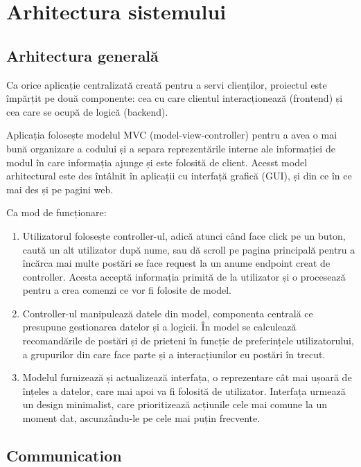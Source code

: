 
\chapter{Arhitectura sistemului}
\label{Arhitectura sistemului}
    \section{Arhitectura generală}
    \label{Arhitectura generală}
    Ca orice aplicație centralizată creată pentru a servi clienților, proiectul este împărțit pe două componente: cea cu care clientul interacționează (frontend) și cea care se ocupă de logică (backend).

    Aplicația folosește modelul MVC (model-view-controller) pentru a avea o mai bună organizare a codului și a separa reprezentările interne ale informației de modul în care informația ajunge și este folosită de client. Acesst model arhitectural este des întâlnit în aplicații cu interfață grafică (GUI), și din ce în ce mai des și pe pagini web. 
    
    Ca mod de funcționare:
    \begin{enumerate}[noitemsep, label=\textbullet, leftmargin=0.3cm]
        \item Utilizatorul folosește controller-ul, adică atunci când face click pe un buton, caută un alt utilizator după nume, sau dă scroll pe pagina principală pentru a încărca mai multe postări se face request la un anume endpoint creat de controller. Acesta acceptă informația primită de la utilizator și o procesează pentru a crea comenzi ce vor fi folosite de model.
        \item Controller-ul manipulează datele din model, componenta centrală ce presupune gestionarea datelor și a logicii. În model se calculează recomandările de postări și de prieteni în funcție de preferințele utilizatorului, a grupurilor din care face parte și a interacțiunilor cu postări în trecut.
        \item Modelul furnizează și actualizează interfața, o reprezentare cât mai ușoară de înțeles a datelor, care mai apoi va fi folosită de utilizator. Interfața urmează un design minimalist, care prioritizează acțiunile cele mai comune la un moment dat, ascunzându-le pe cele mai puțin frecvente. 
    \end{enumerate}
    
    \section{Communication}
